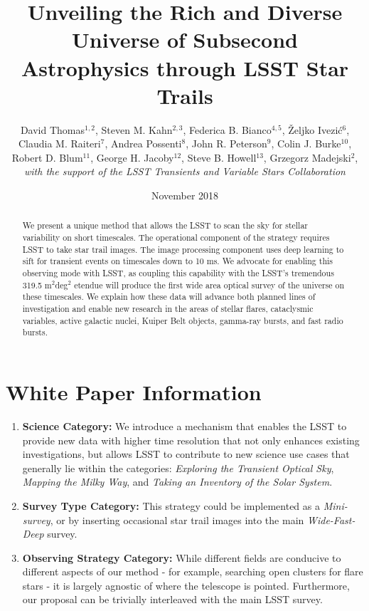 \documentclass[12pt, letterpaper]{article}
\title{Unveiling the Rich and Diverse Universe of Subsecond Astrophysics through LSST Star Trails}
\author{
\parbox{0.9\textwidth}{
\normalsize
David Thomas$^{1,2}$,
Steven M. Kahn$^{2,3}$,
Federica B. Bianco$^{4,5}$,
Željko Ivezić$^{6}$,
Claudia M. Raiteri$^{7}$,
Andrea Possenti$^{8}$,
John R. Peterson$^{9}$,
Colin J. Burke$^{10}$,
Robert D. Blum$^{11}$,
George H. Jacoby$^{12}$,
Steve B. Howell$^{13}$,
Grzegorz Madejski$^{2}$,
\textit{with the support of the LSST Transients and Variable Stars Collaboration
}}}
\date{November 2018}
\begin{document}
\maketitle

\begin{abstract}
We present a unique method that allows the LSST to scan the sky for stellar variability on short timescales.
The operational component of the strategy requires LSST to take star trail images. The image processing component uses deep learning to sift for transient events on timescales down to 10 ms. We advocate for enabling this observing mode with LSST, as coupling this capability with the LSST's tremendous 319.5 m$^2$deg$^2$ etendue will produce the first wide area optical survey of the universe on these timescales. We explain how these data will advance both planned lines of investigation and enable new research in the areas of stellar flares, cataclysmic variables, active galactic nuclei, Kuiper Belt objects, gamma-ray bursts, and fast radio bursts.
\end{abstract}

\section{White Paper Information}

\begin{enumerate} 
\item {\bf Science Category:} We introduce a mechanism that enables the LSST to provide new data with higher time resolution that not only enhances existing investigations, but allows LSST to contribute to new science use cases that generally lie within the categories: \textit{Exploring the Transient Optical Sky}, \textit{Mapping the Milky Way}, and \textit{Taking an Inventory of the Solar System}.

\item {\bf Survey Type Category:} This strategy could be implemented as a \emph{Mini-survey}, or by inserting occasional star trail images into the main \textit{Wide-Fast-Deep} survey.

\item {\bf Observing Strategy Category:}
While different fields are conducive to different aspects of our method - for example, searching open clusters for flare stars - it is largely agnostic of where the telescope is pointed. Furthermore, our proposal can be trivially interleaved with the main LSST survey.

\end{enumerate}  
\end{document}
